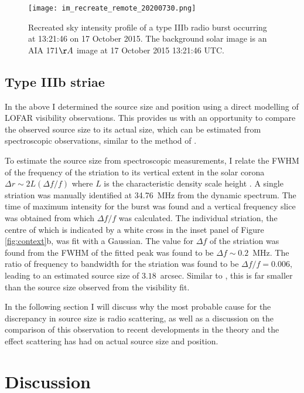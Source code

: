 \begin{figure}
    \centering
    \texttt{[image: im\_recreate\_remote\_20200730.png]}
    \caption[Recreated sky intensity profile of a type IIIb radio burst.]{Recreated sky intensity profile of a type IIIb radio burst occurring at 13:21:46 on 17 October 2015. The background solar image is an AIA 171$\AA$ image at 17 October 2015 13:21:46 UTC.} 
    \label{fig:recreate}
\end{figure}


\subsection{Type IIIb striae}
In the above I determined the source size and position using a direct modelling of LOFAR visibility observations. This provides us with an opportunity to compare the observed source size to its actual size, which can be estimated from spectroscopic observations, similar to the method of \cite{Kontar2017}.

To estimate the source size from spectroscopic measurements, I relate the FWHM of the frequency of the striation to its vertical extent in the solar corona $\Delta r {\sim} 2L \left(\Delta f/f\right)$ where $L$ is the characteristic density scale height \citep{Kontar2017}.
A single striation was manually identified at 34.76~MHz from the dynamic spectrum. The time of maximum intensity for the burst was found and a vertical frequency slice was obtained from which $\Delta f/f$ was calculated. The individual striation, the centre of which is indicated by a white cross in the inset panel of Figure \ref{fig:context}b, was fit with a Gaussian. The value for $\Delta f$ of the striation was found from the FWHM of the fitted peak was found to be $\Delta f \sim 0.2$~MHz. The ratio of frequency to bandwidth for the striation was found to be $\Delta f/f = 0.006$, leading to an estimated source size of $3.18$~arcsec. 
Similar to \cite{Kontar2017}, this is far smaller than the source size observed from the visibility fit.

In the following section I will discuss why the most probable cause for the discrepancy in source size is radio scattering, as well as a discussion on the comparison of this observation to recent developments in the theory and the effect scattering has had on actual source size and position.

\section{Discussion}\label{sec:conclusion}


